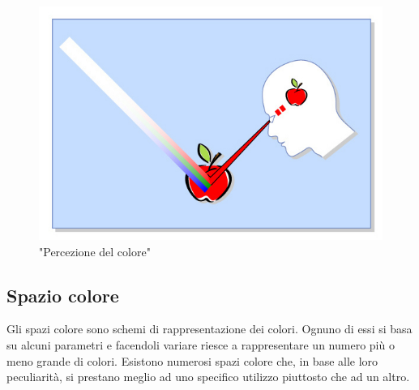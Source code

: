 \documentclass[a4paper,11pt]{article}
\begin{document}
        \begin{figure}[h]
            \centering
            \includegraphics[scale=0.8]{colorimetria1}
            \caption{"Percezione del colore"}
        \end{figure}
        \newpage
        \subsection{Spazio colore}
        Gli spazi colore sono schemi di rappresentazione dei colori. Ognuno di essi si basa su alcuni parametri
        e facendoli variare riesce a rappresentare un numero più o meno grande di colori. Esistono numerosi spazi colore
        che, in base alle loro peculiarità, si prestano meglio ad uno specifico utilizzo piuttosto che ad un altro.
       
\end{document}

